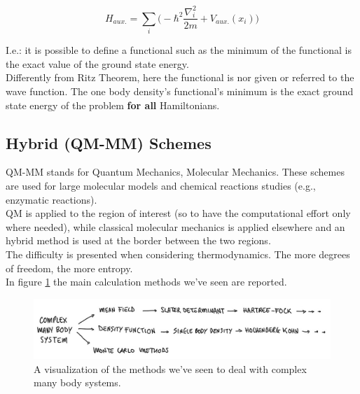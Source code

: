  \[
 H_{aux.} = \sum_i \bigg(-\hbar^2 \frac{\nabla_i^2}{2m} + V_{aux.}(x_i) \bigg)
 \]
 
I.e.: it is possible to define a functional such as the minimum of the functional is the exact value of the ground state energy. \\
Differently from Ritz Theorem, here the functional is nor given or referred to the wave function. 
The one body density's functional's minimum is the exact ground state energy of the problem \textbf{for all} Hamiltonians.\\

\subsection{Hybrid (QM-MM) Schemes}
QM-MM stands for Quantum Mechanics, Molecular Mechanics. 
These schemes are used for large molecular models and chemical reactions studies (e.g., enzymatic reactions).\\
QM is applied to the region of interest (so to have the computational effort only where needed),  while classical molecular mechanics is applied elsewhere and an hybrid method is used at the border between the two regions.\\
The difficulty is presented when considering thermodynamics. The more degrees of freedom, the more entropy.\\
In figure \ref{fig:summary} the main calculation methods we've seen are reported.



\begin{figure}[htbp!]
	\centering
	\includegraphics[scale=0.30]{img_15}
	\caption{A visualization of the methods we've seen to deal with complex many body systems.}
	\label{fig:summary}
\end{figure}
